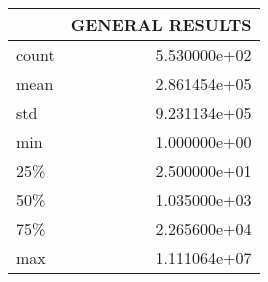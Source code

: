\begin{tabular}{lr}
\toprule
{} &  GENERAL RESULTS \\
\midrule
count &     5.530000e+02 \\
mean  &     2.861454e+05 \\
std   &     9.231134e+05 \\
min   &     1.000000e+00 \\
25\%   &     2.500000e+01 \\
50\%   &     1.035000e+03 \\
75\%   &     2.265600e+04 \\
max   &     1.111064e+07 \\
\bottomrule
\end{tabular}
